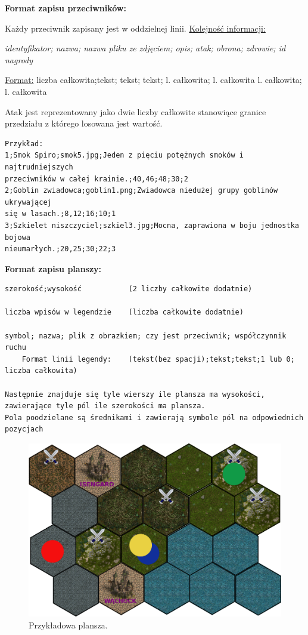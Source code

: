 \documentclass[a4paper, 11pt]{article}
\begin{document}
\noindent\textbf{Format zapisu przeciwników:}

Każdy przeciwnik zapisany jest w oddzielnej linii. \underline{Kolejność informacji:}

\textit{identyfikator; nazwa; nazwa pliku ze zdjęciem; opis; atak; obrona; zdrowie; id nagrody}

\underline{Format:}
liczba całkowita;tekst; tekst; tekst; l. całkowita; l. całkowita l. całkowita; l. całkowita

Atak jest reprezentowany jako dwie liczby całkowite stanowiące granice przedziału z którego losowana jest wartość.

\begin{verbatim}
Przykład:
1;Smok Spiro;smok5.jpg;Jeden z pięciu potężnych smoków i najtrudniejszych 
przeciwników w całej krainie.;40,46;48;30;2
2;Goblin zwiadowca;goblin1.png;Zwiadowca niedużej grupy goblinów ukrywającej
się w lasach.;8,12;16;10;1
3;Szkielet niszczyciel;szkiel3.jpg;Mocna, zaprawiona w boju jednostka bojowa
nieumarłych.;20,25;30;22;3
\end{verbatim}

\newpage

\textbf{Format zapisu planszy:}
\begin{verbatim}
szerokość;wysokość           (2 liczby całkowite dodatnie)

liczba wpisów w legendzie    (liczba całkowite dodatnie)

symbol; nazwa; plik z obrazkiem; czy jest przeciwnik; współczynnik ruchu 
    Format linii legendy:    (tekst(bez spacji);tekst;tekst;1 lub 0; liczba całkowita)

Następnie znajduje się tyle wierszy ile plansza ma wysokości, 
zawierające tyle pól ile szerokości ma plansza.
Pola poodzielane są średnikami i zawierają symbole pól na odpowiednich pozycjach

\end{verbatim}

\begin{figure}[ht]

\centering

\includegraphics[scale=0.3]{plansza.png}

\caption{Przykładowa plansza.} 

\label{Klasy}

\end{figure}
\end{document}

